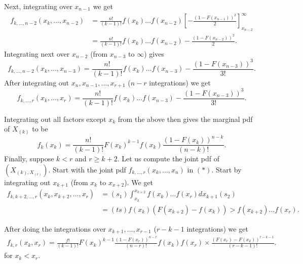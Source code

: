 Next, integrating over $x_{n - 1}$ we get 
\begin{align*}
	f_{k, \ldots, n - 2}\left( x_{k} , \ldots , x_{n - 2} \right) &= \frac{n!}{\left( k - 1 \right) !} f\left( x_{k } \right) \ldots f \left( x _{n - 2} \right) \left[ - \frac{\left( 1 - F\left( x_{n -1} \right)  \right) ^2}{2} \right] ^{\infty}_{x _{n -2}}\\
								      &= \frac{n!}{\left( k - 1 \right) !} f\left( x_{k} \right) \ldots f \left( x_{n - 2} \right)  - \frac{\left( 1 - F\left( x_{n -2} \right)  \right) ^2}{2}
.\end{align*}
Integrating next over $x_{n - 2}$ (from $x_{n - 3}$ to $\infty$) gives 
\[
		f_{k, \ldots, n - 2}\left( x_{k} , \ldots , x_{n - 3} \right)=    \frac{n!}{\left( k - 1 \right) !} f\left( x_{k} \right) \ldots f \left( x_{n - 3} \right)  - \frac{\left( 1 - F\left( x_{n -3} \right)  \right) ^3}{3!}
.\] 
After integrating out $x_{n}, x_{n-1} , \ldots ,  x_{r+1}$ ($n - r$ integrations) we get 
\[
		f_{k, \ldots, r}\left( x_{k} , \ldots , x_{r} \right)=    \frac{n!}{\left( k - 1 \right) !} f\left( x_{k} \right) \ldots f \left( x_{n - 3} \right)  - \frac{\left( 1 - F\left( x_{n -3} \right)  \right) ^3}{3!}
.\] 


Integrating out all factors except $x_{k}$ from the above then gives the marginal pdf of $X_{\left( k \right) }$ to be 
\[
	f_{k}\left( x_k \right) = \frac{n!}{\left( k - 1 \right) !} F\left( x_{k} \right) ^{k - 1}f\left( x_{k} \right) \frac{\left( 1 - F\left( x_{k} \right)  \right) ^{n - k}}{\left( n - k \right) !}
.\] 
Finally, suppose $k < r$ and $r \ge  k + 2$. Let us compute the joint pdf of $\left( X_{\left( k \right) , X_{\left( r \right) }} \right) $. Start with the joint pdf $f_{k , \ldots, r}\left( x_{k} , \ldots , x_{n} \right) $ in $\left( * \right) $. Start by integrating out $x_{k + 1}$ (from $x_k$ to $x_{x + 2}$). We get 
\begin{align*}
	f_{k, k + 2, \ldots, r }\left( x_k, x_{k + 2}, \ldots, x _{r} \right) &= \left( s_1 \right) \int_{x_k}^{x_{k + 2}} f\left( x_k \right) \ldots f\left( x_r \right) dx_{k + 1} \left( s_2 \right) \\ 
									      &= \left( ts \right) f\left( x_k \right) \left( F\left( x_{k + 2} \right) - f\left( x_k \right)  \right) > f\left( x _{k + 2} \right) \ldots f \left( x_{r} \right)  
.\end{align*}

After doing the integrations over $x_{k+1} , \ldots , x_{r-1}$ ($r - k - 1$ integrations) we get 
\begin{align*}
	f_{k, r}\left( x_{k}, x_{r} \right) = \frac{f!}{\left( k - 1 \right) !}F\left( x_{k} \right) ^{k - 1} \frac{\left( 1 - F\left( x _{r} \right)  \right) ^{n - r}}{\left( n - r \right) !}f\left( x _{k} \right) f\left( x _{r} \right)  \times \frac{\left( F\left( x_{r} \right) - F\left( x_{k} \right)  \right) ^{r - k - 1}}{\left( r - k - 1 \right) !}
.\end{align*}
for $x_{k}< x_{r}$. 
